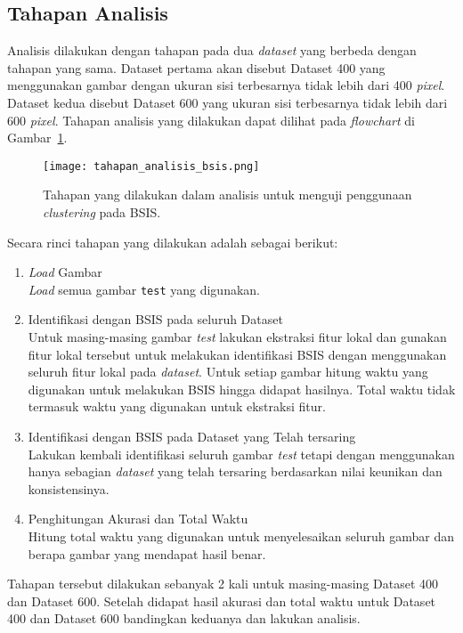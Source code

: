 \subsection{Tahapan Analisis}
Analisis dilakukan dengan tahapan pada dua \textit{dataset} yang berbeda dengan tahapan yang sama. Dataset pertama akan disebut Dataset 400 yang menggunakan gambar dengan ukuran sisi terbesarnya tidak lebih dari 400 \textit{pixel}. Dataset kedua disebut Dataset 600 yang ukuran sisi terbesarnya tidak lebih dari 600 \textit{pixel}. Tahapan analisis yang dilakukan dapat dilihat pada \textit{flowchart} di Gambar~\ref{fig:tahapan_analisis_bsis}.
\begin{figure}[H]
	\centering
	\texttt{[image: tahapan\_analisis\_bsis.png]}
	\caption{Tahapan yang dilakukan dalam analisis untuk menguji penggunaan \textit{clustering} pada BSIS.}
	\label{fig:tahapan_analisis_bsis}
\end{figure}
Secara rinci tahapan yang dilakukan adalah sebagai berikut:
\begin{enumerate}
	\item \textit{Load} Gambar \\
	\textit{Load} semua gambar \texttt{test} yang digunakan.
	\item Identifikasi dengan BSIS pada seluruh Dataset \\
	Untuk masing-masing gambar \textit{test} lakukan ekstraksi fitur lokal dan gunakan fitur lokal tersebut untuk melakukan identifikasi BSIS dengan menggunakan seluruh fitur lokal pada \textit{dataset}. Untuk setiap gambar hitung waktu yang digunakan untuk melakukan BSIS hingga didapat hasilnya. Total waktu tidak termasuk waktu yang digunakan untuk ekstraksi fitur.
	\item Identifikasi dengan BSIS pada Dataset yang Telah tersaring \\
	Lakukan kembali identifikasi seluruh gambar \textit{test} tetapi dengan menggunakan hanya sebagian \textit{dataset} yang telah tersaring berdasarkan nilai keunikan dan konsistensinya.
	\item Penghitungan Akurasi dan Total Waktu \\
	Hitung total waktu yang digunakan untuk menyelesaikan seluruh gambar dan berapa gambar yang mendapat hasil benar.
\end{enumerate}
Tahapan tersebut dilakukan sebanyak 2 kali untuk masing-masing Dataset 400 dan Dataset 600. Setelah didapat hasil akurasi dan total waktu untuk Dataset 400 dan Dataset 600 bandingkan keduanya dan lakukan analisis.


